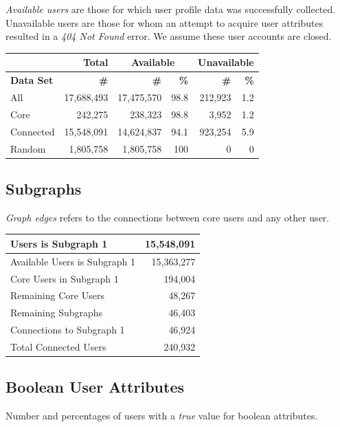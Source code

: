 
\textit{Available users} are those for which user profile data was successfully collected.  Unavailable users are those for whom an attempt to acquire user attributes resulted in a \textit{404 Not Found} error.  We assume these user accounts are closed.\\

\begin{tabular}[t]{| l | r | r | r | r | r |}
\hline
& \textbf{Total} & \multicolumn{2}{|c|}{\textbf{Available}} & \multicolumn{2}{|c|}{\textbf{Unavailable}} \\ \hline
\textbf{Data Set} & \textbf{\#} & \textbf{\#} & \textbf{\%} & \textbf{\#} & \textbf{\%} \\ \hline
All & 17,688,493 & 17,475,570 & 98.8 & 212,923 & 1.2 \\ \hline
Core & 242,275 & 238,323 & 98.8 & 3,952 & 1.2 \\ \hline
Connected & 15,548,091 & 14,624,837 & 94.1 & 923,254 & 5.9 \\ \hline
Random & 1,805,758 & 1,805,758 & 100 & 0 & 0 \\ \hline
\end{tabular}

\subsection{Subgraphs}
\textit{Graph edges} refers to the connections between core users and any other user.\\

\begin{tabular}{| l | r | }
\hline
Users is Subgraph 1 & 15,548,091 \\ \hline
Available Users is Subgraph 1 & 15,363,277 \\ \hline
Core Users in Subgraph 1  & 194,004 \\ \hline
Remaining Core Users  & 48,267 \\ \hline
Remaining Subgraphs  & 46,403 \\ \hline
Connections to Subgraph 1  & 46,924 \\ \hline
Total Connected Users & 240,932 \\ \hline
\end{tabular}

\subsection{Boolean User Attributes}
Number and percentages of users with a \textit{true} value for boolean attributes.


